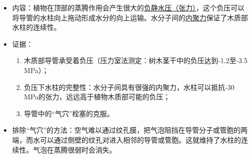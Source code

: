 \begin{enumerate}
\begin{itemize}
        \item 内容：植物在顶部的蒸腾作用会产生很大的\uline{负静水压（张力）}，这个负压可以将导管的水柱向上拖动形成水分的向上运输。水分子间的\uline{内聚力}保证了木质部水柱的连续性。
        \item 证据：
        \begin{enumerate}
            \item 木质部导管承受着负压（压力室法测定：树木茎干中的负压达到-1.2至-3.5 MPa）；
            \item 负压下水柱的完整性：水分子间具有很强的内聚力，水柱可以抵抗-30 MPa的张力，远远高于植物木质部可能的负压；
            \item 导管中的“气穴”栓塞的克服。
        \end{enumerate}
        \item 排除“气穴”的方法：空气难以通过纹孔膜，把气泡阻挡在导管分子或管胞的两端，而水可以通过侧壁的纹孔对进入相邻的导管或管胞。这就维持了水柱的连续性。气泡在蒸腾很弱时会消失。
    \end{itemize}
\end{enumerate}

